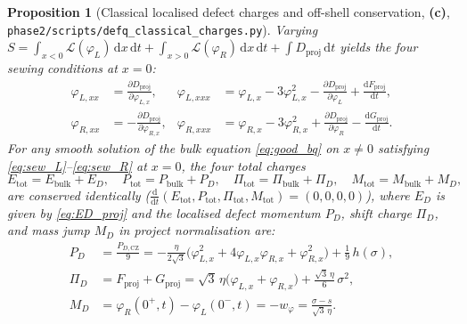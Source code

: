 \documentclass[11pt,a4paper]{article}
\newcommand{\Lc}{\textsf{\textbf{(c)}}}
\newcommand{\dd}{\mathrm{d}}
\newcommand{\sclass}{\texttt{phase2/\allowbreak scripts/\allowbreak defq\_\allowbreak classical\_\allowbreak charges.py}}
\newtheorem{proposition}{Proposition}[section]
\theoremstyle{remark}
\begin{document}
\begin{proposition}[Classical localised defect charges and off-shell conservation, \Lc, \sclass]\label{prop:classical_charges}
Varying $S = \int_{x<0}\mathcal{L}(\varphi_L)\,\dd x\,\dd t + \int_{x>0}\mathcal{L}(\varphi_R)\,\dd x\,\dd t + \int D_{\mathrm{proj}}\,\dd t$
yields the four sewing conditions at $x=0$:
\begin{align}
  \varphi_{L,xx} &= \frac{\partial D_{\mathrm{proj}}}{\partial \varphi_{L,x}}, &
  \varphi_{L,xxx} &= \varphi_{L,x} - 3\varphi_{L,x}^2 - \frac{\partial D_{\mathrm{proj}}}{\partial \varphi_L} + \frac{\dd F_{\mathrm{proj}}}{\dd t}, \label{eq:sew_L}\\
  \varphi_{R,xx} &= -\frac{\partial D_{\mathrm{proj}}}{\partial \varphi_{R,x}}, &
  \varphi_{R,xxx} &= \varphi_{R,x} - 3\varphi_{R,x}^2 + \frac{\partial D_{\mathrm{proj}}}{\partial \varphi_R} - \frac{\dd G_{\mathrm{proj}}}{\dd t}. \label{eq:sew_R}
\end{align}
For any smooth solution of the bulk equation \eqref{eq:good_bq} on $x \ne 0$
satisfying \eqref{eq:sew_L}--\eqref{eq:sew_R} at $x=0$, the four total charges
\begin{equation}\label{eq:tot_charges}
  E_{\mathrm{tot}} = E_{\mathrm{bulk}} + E_D, \quad
  P_{\mathrm{tot}} = P_{\mathrm{bulk}} + P_D, \quad
  \Pi_{\mathrm{tot}} = \Pi_{\mathrm{bulk}} + \Pi_D, \quad
  M_{\mathrm{tot}} = M_{\mathrm{bulk}} + M_D,
\end{equation}
are conserved identically ($\frac{\dd}{\dd t}(E_{\mathrm{tot}},P_{\mathrm{tot}},\Pi_{\mathrm{tot}},M_{\mathrm{tot}}) = (0,0,0,0)$),
where $E_D$ is given by \eqref{eq:ED_proj} and the localised defect momentum
$P_D$, shift charge $\Pi_D$, and mass jump $M_D$ in project normalisation are:
\begin{align}
  P_D &= \frac{P_{D,\mathrm{CZ}}}{9}
  = -\frac{\eta}{2\sqrt{3}}\big(\varphi_{L,x}^2 + 4\varphi_{L,x}\varphi_{R,x} + \varphi_{R,x}^2\big) + \frac{1}{9}\,h(\sigma), \label{eq:PD_proj}\\
  \Pi_D &= F_{\mathrm{proj}} + G_{\mathrm{proj}}
  = \sqrt{3}\,\eta\big(\varphi_{L,x} + \varphi_{R,x}\big) + \frac{\sqrt{3}\,\eta}{6}\,\sigma^2, \label{eq:PiD_proj}\\
  M_D &= \varphi_R(0^+,t) - \varphi_L(0^-,t) = -w_\varphi = \frac{\sigma - s}{\sqrt{3}\,\eta}. \label{eq:MD_proj}
\end{align}
\end{proposition}
\end{document}
